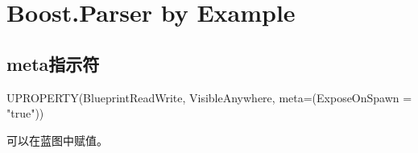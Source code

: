 \documentclass{MyBook}
\begin{document}
\frontmatter


\mainmatter
{}
\chapter{Boost.Parser by Example}


\section{meta指示符}
\begin{code}
UPROPERTY(BlueprintReadWrite, VisibleAnywhere, meta=(ExposeOnSpawn = "true"))
\end{code}
可以在蓝图中赋值。
\end{document}
